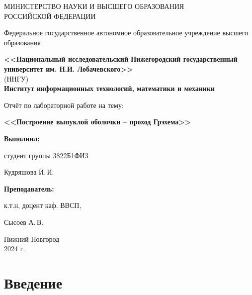 \documentclass[a4paper,12pt]{article}
\begin{document}
	\begin{titlepage}
	\begin{center}
		\large
		{МИНИСТЕРСТВО НАУКИ И ВЫСШЕГО ОБРАЗОВАНИЯ\\ РОССИЙСКОЙ ФЕДЕРАЦИИ}
		
		Федеральное государственное автономное образовательное учреждение высшего образования
		\vspace{0.5cm}
		
		\textbf{<<Национальный исследовательский Нижегородский государственный университет им. Н.И. Лобачевского>>}\\
		(ННГУ)\\
		\vspace{1cm}
		\textbf{Институт информационных технологий, математики и механики}\\
		\vspace{1cm}
		
		\vfill

		
		\Large
		Отчёт по лабораторной работе на тему:
		
		\textbf{<<Построение выпуклой оболочки – проход Грэхема>>}
		{\LARGE 
		}
		\bigskip
		
		
	\end{center}
	\vfill
	
	
	\vfill
	
	\hfill\begin{minipage}{0.4\textwidth}
		\textbf{Выполнил:} 

            студент группы 3822Б1ФИ3 

            Кудряшова И.\,И. \bigskip
            
	\end{minipage}%
	
	\hfill\begin{minipage}{0.4\textwidth}
		\textbf{Преподаватель:}
		
    к.т.н, доцент каф. ВВСП, 
    
    Сысоев А.\,В.
	\end{minipage}%
	\vfill
	
	\begin{center}
		Нижний Новгород\\
		2024 г.
	\end{center}
\end{titlepage}
\thispagestyle{empty}
\tableofcontents
\newpage

\section*{Введение}
\end{document}
